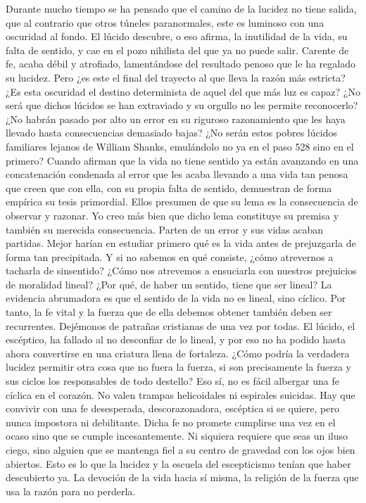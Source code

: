 \documentclass[a4paper,11pt,openright,twocolumn]{book}
\begin{document}
Durante mucho tiempo se ha pensado que el camino de la lucidez no tiene salida, que al contrario que otros túneles paranormales, este es luminoso con una oscuridad al fondo. El lúcido descubre, o eso afirma, la inutilidad de la vida, su falta de sentido, y cae en el pozo nihilista del que ya no puede salir. Carente de fe, acaba débil y atrofiado, lamentándose del resultado penoso que le ha regalado su lucidez. Pero ¿es este el final del trayecto al que lleva la razón más estricta? ¿Es esta oscuridad el destino determinista de aquel del que más luz es capaz? ¿No será que dichos lúcidos se han extraviado y su orgullo no les permite reconocerlo? ¿No habrán pasado por alto un error en su riguroso razonamiento que les haya llevado hasta consecuencias demasiado bajas? ¿No serán estos pobres lúcidos familiares lejanos de William Shanks, emulándolo no ya en el paso 528 sino en el primero? Cuando afirman que la vida no tiene sentido ya están avanzando en una concatenación condenada al error que les acaba llevando a una vida tan penosa que creen que con ella, con su propia falta de sentido, demuestran de forma empírica su tesis primordial. Ellos presumen de que su lema es la consecuencia de observar y razonar. Yo creo más bien que dicho lema constituye su premisa y también su merecida consecuencia. Parten de un error y sus vidas acaban partidas. Mejor harían en estudiar primero qué es la vida antes de prejuzgarla de forma tan precipitada. Y si no sabemos en qué consiste, ¿cómo atrevernos a tacharla de sinsentido? ¿Cómo nos atrevemos a ensuciarla con nuestros prejuicios de moralidad lineal? ¿Por qué, de haber un sentido, tiene que ser lineal? La evidencia abrumadora es que el sentido de la vida no es lineal, sino cíclico. Por tanto, la fe vital y la fuerza que de ella debemos obtener también deben ser recurrentes. Dejémonos de patrañas cristianas de una vez por todas. El lúcido, el escéptico, ha fallado al no desconfiar de lo lineal, y por eso no ha podido hasta ahora convertirse en una criatura llena de fortaleza. ¿Cómo podría la verdadera lucidez permitir otra cosa que no fuera la fuerza, si son precisamente la fuerza y sus ciclos los responsables de todo destello? Eso sí, no es fácil albergar una fe cíclica en el corazón. No valen trampas helicoidales ni espirales suicidas. Hay que convivir con una fe desesperada, descorazonadora, escéptica si se quiere, pero nunca impostora ni debilitante. Dicha fe no promete cumplirse una vez en el ocaso sino que se cumple incesantemente. Ni siquiera requiere que seas un iluso ciego, sino alguien que se mantenga fiel a su centro de gravedad con los ojos bien abiertos. Esto es lo que la lucidez y la escuela del escepticismo tenían que haber descubierto ya. La devoción de la vida hacia sí misma, la religión de la fuerza que usa la razón para no perderla. 
\end{document}
